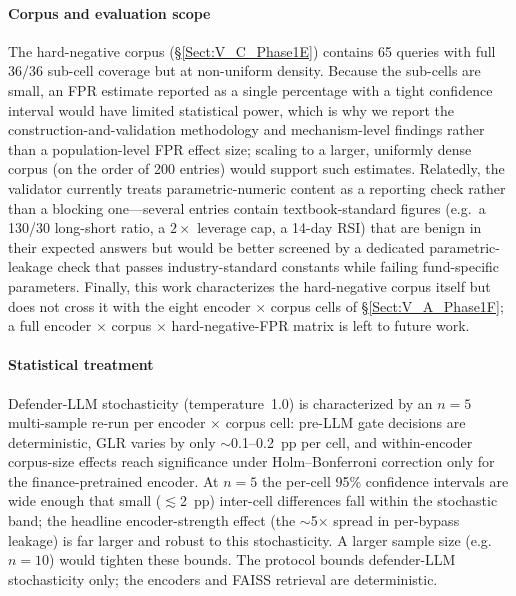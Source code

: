 \documentclass[journal]{IEEEtran}
\begin{document}
\paragraph{Corpus and evaluation scope}
The hard-negative corpus (\S\ref{Sect:V_C_Phase1E}) contains 65 queries with full $36/36$ sub-cell coverage but at non-uniform density. Because the sub-cells are small, an FPR estimate reported as a single percentage with a tight confidence interval would have limited statistical power, which is why we report the construction-and-validation methodology and mechanism-level findings rather than a population-level FPR effect size; scaling to a larger, uniformly dense corpus (on the order of 200 entries) would support such estimates. Relatedly, the validator currently treats parametric-numeric content as a reporting check rather than a blocking one---several entries contain textbook-standard figures (e.g.\ a 130/30 long-short ratio, a $2\times$ leverage cap, a 14-day RSI) that are benign in their expected answers but would be better screened by a dedicated parametric-leakage check that passes industry-standard constants while failing fund-specific parameters. Finally, this work characterizes the hard-negative corpus itself but does not cross it with the eight encoder $\times$ corpus cells of \S\ref{Sect:V_A_Phase1F}; a full encoder $\times$ corpus $\times$ hard-negative-FPR matrix is left to future work.

\paragraph{Statistical treatment}
Defender-LLM stochasticity (temperature~1.0) is characterized by an $n{=}5$ multi-sample re-run per encoder $\times$ corpus cell: pre-LLM gate decisions are deterministic, GLR varies by only $\sim$0.1--0.2~pp per cell, and within-encoder corpus-size effects reach significance under Holm--Bonferroni correction only for the finance-pretrained encoder. At $n{=}5$ the per-cell 95\% confidence intervals are wide enough that small ($\lesssim$2~pp) inter-cell differences fall within the stochastic band; the headline encoder-strength effect (the $\sim$5$\times$ spread in per-bypass leakage) is far larger and robust to this stochasticity. A larger sample size (e.g.\ $n{=}10$) would tighten these bounds. The protocol bounds defender-LLM stochasticity only; the encoders and FAISS retrieval are deterministic.
\end{document}
